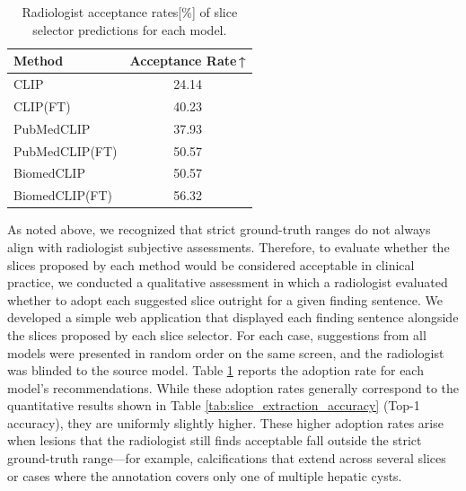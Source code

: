 \documentclass[bioengineering,article,submit,pdftex,moreauthors]{Definitions/mdpi}
\begin{document}
\begin{table}[ht]
  \centering
  \caption{Radiologist acceptance rates[\%] of slice selector predictions for each model.}
  \label{tab:slice_selector_adoption}
  \begin{tabular}{lc}
    \toprule
    Method                  & Acceptance Rate\,↑ \\
    \midrule
    CLIP                    & 24.14        \\
    CLIP(FT)                & 40.23        \\
    PubMedCLIP              & 37.93        \\
    PubMedCLIP(FT)          & 50.57        \\
    BiomedCLIP              & 50.57        \\
    BiomedCLIP(FT)          & 56.32        \\
    \bottomrule
  \end{tabular}
\end{table}


As noted above, we recognized that strict ground-truth ranges do not always align with radiologist subjective assessments.
Therefore, to evaluate whether the slices proposed by each method would be considered acceptable in clinical practice, we conducted a qualitative assessment in which a radiologist evaluated whether to adopt each suggested slice outright for a given finding sentence. 
We developed a simple web application that displayed each finding sentence alongside the slices proposed by each slice selector. 
For each case, suggestions from all models were presented in random order on the same screen, and the radiologist was blinded to the source model. 
Table \ref{tab:slice_selector_adoption} reports the adoption rate for each model’s recommendations. 
While these adoption rates generally correspond to the quantitative results shown in Table \ref{tab:slice_extraction_accuracy} (Top-1 accuracy), they are uniformly slightly higher. 
These higher adoption rates arise when lesions that the radiologist still finds acceptable fall outside the strict ground-truth range—for example, calcifications that extend across several slices or cases where the annotation covers only one of multiple hepatic cysts.
\end{document}
